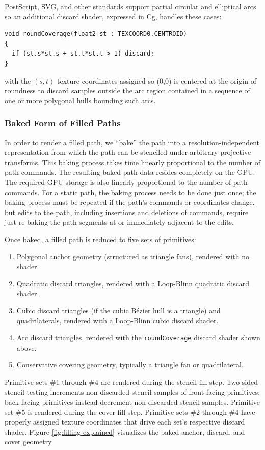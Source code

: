 PostScript, SVG, and other standards support partial circular and
elliptical arcs so an additional discard shader, expressed in Cg, handles
these cases:
\label{round-coverage-shader}
\begin{lstlisting}
void roundCoverage(float2 st : TEXCOORD0.CENTROID)
{
  if (st.s*st.s + st.t*st.t > 1) discard;
}
\end{lstlisting}
with the $(s,t)$ texture coordinates assigned so (0,0) is centered
at the origin of roundness to discard
samples outside the arc region contained in a sequence of one or more
polygonal hulls bounding such arcs.

\subsubsection{Baked Form of Filled Paths}

In order to render a filled path, we ``bake'' the path into a
resolution-independent representation from which the path can be stenciled
under arbitrary projective transforms.  This baking process takes time
linearly proportional to the number of path commands.  The resulting baked
path data resides completely on the GPU.  The required GPU storage is
also linearly proportional to the number of path commands.  For a static
path, the baking process needs to be done just once; the baking process must
be repeated if the path's commands or coordinates change, but edits to
the path, including insertions and deletions of commands, require just
re-baking the path segments at or immediately adjacent to the edits.

Once baked, a filled path is reduced to five sets of primitives:
\begin{enumerate}
  \item Polygonal anchor geometry (structured as triangle fans), rendered
  with no shader.
  \item Quadratic discard triangles, rendered with a Loop-Blinn quadratic
  discard shader.
  \item Cubic discard triangles (if the cubic B\'{e}zier hull is a
  triangle) and quadrilaterals, rendered with a Loop-Blinn cubic discard
  shader.
  \item Arc discard triangles, rendered with the {\tt roundCoverage}
  discard shader shown above.
  \item Conservative covering geometry, typically a triangle fan or
  quadrilateral.
\end{enumerate}
Primitive sets \#1 through \#4 are rendered during the stencil fill step.  Two-sided stencil testing increments non-discarded stencil samples of front-facing primitives; back-facing primitives instead decrement non-discarded stencil samples.
Primitive set \#5 is rendered during the cover fill step.  Primitive sets
\#2 through \#4 have properly assigned texture coordinates that drive
each set's respective discard shader.  Figure \ref{fig:filling-explained}
visualizes the baked anchor, discard, and cover geometry.

